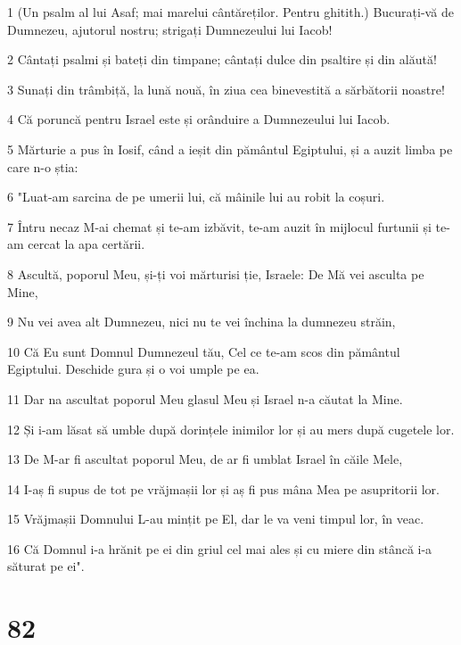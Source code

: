 \par 1 (Un psalm al lui Asaf; mai marelui cântăreților. Pentru ghitith.) Bucurați-vă de Dumnezeu, ajutorul nostru; strigați Dumnezeului lui Iacob!
\par 2 Cântați psalmi și bateți din timpane; cântați dulce din psaltire și din alăută!
\par 3 Sunați din trâmbiță, la lună nouă, în ziua cea binevestită a sărbătorii noastre!
\par 4 Că poruncă pentru Israel este și orânduire a Dumnezeului lui Iacob.
\par 5 Mărturie a pus în Iosif, când a ieșit din pământul Egiptului, și a auzit limba pe care n-o știa:
\par 6 "Luat-am sarcina de pe umerii lui, că mâinile lui au robit la coșuri.
\par 7 Întru necaz M-ai chemat și te-am izbăvit, te-am auzit în mijlocul furtunii și te-am cercat la apa certării.
\par 8 Ascultă, poporul Meu, și-ți voi mărturisi ție, Israele: De Mă vei asculta pe Mine,
\par 9 Nu vei avea alt Dumnezeu, nici nu te vei închina la dumnezeu străin,
\par 10 Că Eu sunt Domnul Dumnezeul tău, Cel ce te-am scos din pământul Egiptului. Deschide gura și o voi umple pe ea.
\par 11 Dar na ascultat poporul Meu glasul Meu și Israel n-a căutat la Mine.
\par 12 Și i-am lăsat să umble după dorințele inimilor lor și au mers după cugetele lor.
\par 13 De M-ar fi ascultat poporul Meu, de ar fi umblat Israel în căile Mele,
\par 14 I-aș fi supus de tot pe vrăjmașii lor și aș fi pus mâna Mea pe asupritorii lor.
\par 15 Vrăjmașii Domnului L-au mințit pe El, dar le va veni timpul lor, în veac.
\par 16 Că Domnul i-a hrănit pe ei din griul cel mai ales și cu miere din stâncă i-a săturat pe ei".

\chapter{82}

